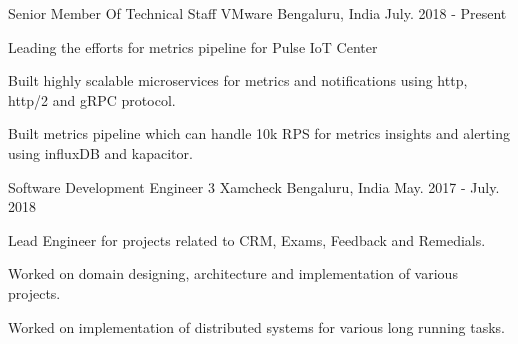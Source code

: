 

\begin{cventries}
  \cventry
    {Senior Member Of Technical Staff} %
    {VMware} %
    {Bengaluru, India} %
    {July. 2018 - Present} %
    {
      \begin{cvitems} %
        \item {Leading the efforts for metrics pipeline for Pulse IoT Center}
        \item {Built highly scalable microservices for metrics and notifications using http, http/2 and gRPC protocol.}
        \item {Built metrics pipeline which can handle 10k RPS for metrics insights and alerting using influxDB and kapacitor.}
      \end{cvitems}
    }

  \cventry
    {Software Development Engineer 3} %
    {Xamcheck} %
    {Bengaluru, India} %
    {May. 2017 - July. 2018} %
    {
      \begin{cvitems} %
        \item {Lead Engineer for projects related to CRM, Exams, Feedback and Remedials.}
        \item {Worked on domain designing, architecture and implementation of various projects.}
        \item {Worked on implementation of distributed systems for various long running tasks. }
      \end{cvitems}
    }


\end{cventries}
